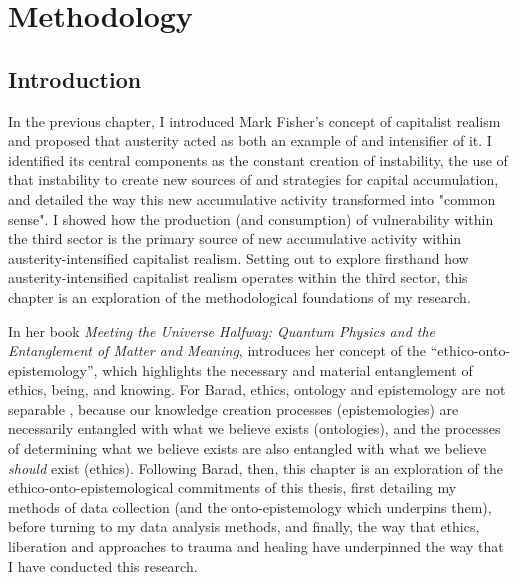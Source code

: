 \chapter{Methodology}
\label{ch:3}
\section{Introduction}
\label{sec:3-1-intro}


In the previous chapter, I introduced Mark Fisher’s concept of capitalist realism and proposed that austerity acted as both an example of and intensifier of it. I identified its central components as the constant creation of instability, the use of that instability to create new sources of and strategies for capital accumulation, and detailed the way this new accumulative activity transformed into "common sense". I showed how the production (and consumption) of vulnerability within the third sector is the primary source of new accumulative activity within austerity-intensified capitalist realism. Setting out to explore firsthand how austerity-intensified capitalist realism operates within the third sector, this chapter is an exploration of the methodological foundations of my research. 

In her  book \emph{Meeting the Universe Halfway: Quantum Physics and the Entanglement of Matter and Meaning}, \citet{barad_meeting_2007} introduces her concept of the “ethico-onto-epistemology”, which highlights the necessary and material entanglement of ethics, being, and knowing. For Barad, ethics, ontology and epistemology are not separable \citep[90]{barad_meeting_2007}, because our knowledge creation processes (epistemologies) are necessarily entangled with what we believe exists (ontologies), and the processes of determining what we believe exists are also entangled with what we believe \textit{should} exist (ethics). Following Barad, then, this chapter is an exploration of the ethico-onto-epistemological commitments of this thesis, first detailing my methods of data collection (and the onto-epistemology which underpins them), before turning to my data analysis methods, and finally, the way that ethics, liberation and approaches to trauma and healing have underpinned the way that I have conducted this research.

